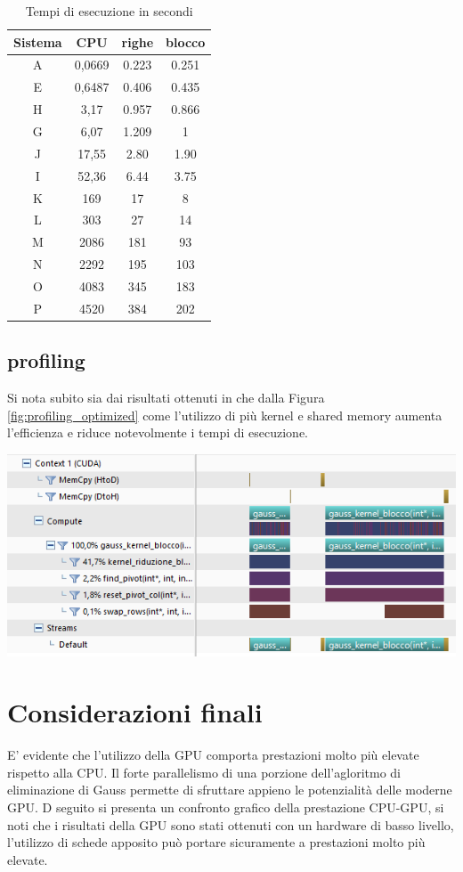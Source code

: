 \documentclass{article}
\begin{document}
\begin{table}[h!]
\centering
 \begin{tabular}{|c | c | c | c |} 
 \hline
 Sistema & CPU & righe & blocco\\
 \hline
A & 0,0669    & 0.223 & 0.251\\
E & 0,6487    & 0.406 & 0.435\\	
H & 3,17      & 0.957 & 0.866\\
G & 6,07      & 1.209 & 1\\
J & 17,55     & 2.80  & 1.90\\
I & 52,36     & 6.44  & 3.75\\
K & 169       & 17    & 8\\
L & 303       & 27    & 14\\
M & 2086      & 181   & 93\\
N & 2292      & 195   & 103\\
O & 4083      & 345   & 183\\
P & 4520      & 384   & 202\\
 \hline

\end{tabular}
\caption{Tempi di esecuzione in secondi}
\label{table:1}
\end{table}

\subsection{profiling}
Si nota subito sia dai risultati ottenuti in che dalla Figura \ref{fig:profiling_optimized} come l'utilizzo di più kernel e shared memory aumenta l'efficienza e riduce notevolmente i tempi di esecuzione. 
	\begin{center}
		\includegraphics[width = \textwidth]{profiling_optimized.png}
		\label{fig:profiling_optimized}
	\end{center}



\section{Considerazioni finali}
E' evidente che l'utilizzo della GPU comporta prestazioni molto più elevate rispetto alla CPU. Il forte parallelismo di una porzione dell'agloritmo di eliminazione di Gauss permette di sfruttare appieno le potenzialità delle moderne GPU. D seguito si presenta un confronto grafico della prestazione CPU-GPU, si noti che i risultati della GPU sono stati ottenuti con un hardware di basso livello, l'utilizzo di schede apposito può portare sicuramente a prestazioni molto più elevate.
\end{document}
